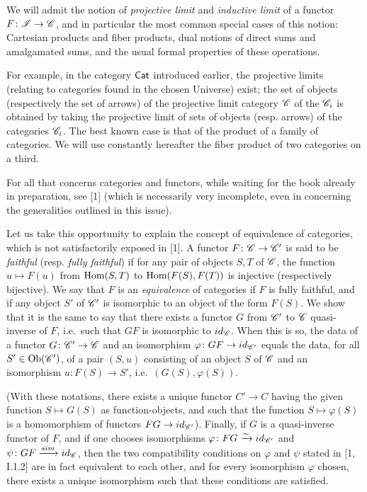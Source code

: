 We will admit the notion of \emph{projective limit} and \emph{inductive limit} of a functor $F \colon \mathscr{I} \to \mathscr{C}$, and in particular the most common special cases of this notion:
Cartesian products and fiber products, dual notions of direct sums and amalgamated sums, and the usual formal properties of these operations.

For example, in the category $\mathsf{Cat}$ introduced earlier, the projective limits
(relating to categories found in the chosen Universe) exist; the set of objects (respectively the set of arrows) of the projective limit category $\mathscr{C}$ of the $\mathscr{C}_i$ is obtained by taking the projective limit of sets of objects (resp. arrows) of the categories $\mathscr{C}_i$. The best known case is that of the product of a family of
categories. We will use constantly hereafter the fiber product of two categories
on a third.

For all that concerns categories and functors, while waiting for the book already in preparation, see [1] (which is necessarily very incomplete, even in
concerning the generalities outlined in this issue).

Let us take this opportunity to explain the concept of equivalence of categories, which is not satisfactorily exposed in [1]. 
A functor $F \colon \mathscr{C} \to \mathscr{C}'$ is said to be \emph{faithful} (resp. \emph{fully faithful}) if for any pair of objects $S, T$ of $\mathscr{C}$, the function $u \mapsto F (u)$ from $\mathrm{Hom} (S, T)$ to $\mathrm{Hom} (F (S), F (T))$ is injective (respectively bijective). 
We say that $F$ is an \emph{equivalence} of categories if $F$ is fully faithful, and if any object $S'$ of $\mathscr{C}'$ is isomorphic to an object of the form $F (S)$.
We show that it is the same to say that there exists a functor $G$ from $\mathscr{C}'$ to $\mathscr{C}$ quasi-inverse of $F$, i.e.\ such that $GF$ is isomorphic to $id_{\mathscr{C}}$.
When this is so, the data of a functor $G \colon \mathscr{C}' \to \mathscr{C}$ and an isomorphism $\varphi \colon GF \to id_{\mathscr{C}'}$ equals the data, for all $S' \in \mathrm{Ob} (\mathscr{C}')$, of a pair $(S, u)$ consisting of an object $S$ of $\mathscr{C}$ and an isomorphism $u \colon F (S) \to S'$, i.e.\ $(G (S), \varphi (S))$.

(With these notations, there exists a unique functor $C' \to C$ having the given function $S \mapsto G (S)$ as function-objects, and such that the function $S \mapsto \varphi (S)$ is a homomorphism of functors $FG \to id_{\mathscr{C}'}$).
%
Finally, if $G$ is a quasi-inverse functor of $F$, and if one chooses isomorphisms $\varphi \colon FG \xrightarrow{\sim} id_{\mathscr{C}'}$ and $\psi \colon GF \xrightarrow{sim} id_{\mathscr{C}}$, then the two compatibility conditions on $\varphi$ and $\psi$ stated in [1, I.1.2] are in fact equivalent to each other, and for every isomorphism $\varphi$ chosen, there exists a unique isomorphism such that these conditions are satisfied.


